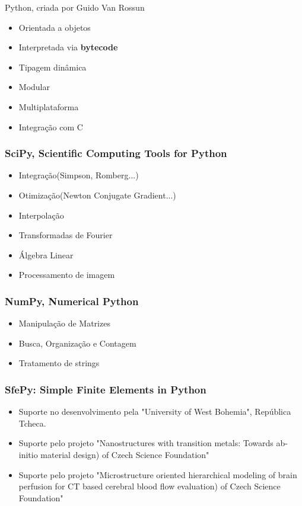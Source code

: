 \documentclass{beamer}
\begin{document}
\begin{frame}
    Python, criada por Guido Van Rossun
    \begin{itemize}
        \item Orientada a objetos
        \item Interpretada via \textbf{bytecode}
        \item Tipagem dinâmica
        \item Modular
        \item Multiplataforma
        \item Integração com C
    \end{itemize}
\end{frame}

\begin{frame}
    \frametitle{SciPy, Scientific Computing Tools for Python}
    \begin{itemize}
        \item Integração(Simpson, Romberg...)
        \item Otimização(Newton Conjugate Gradient...)
        \item Interpolação
        \item Transformadas de Fourier
        \item Álgebra Linear
        \item Processamento de imagem
    \end{itemize}
\end{frame}


\begin{frame}
    \frametitle{NumPy, Numerical Python}
    \begin{itemize}
        \item Manipulação de Matrizes
        \item Busca, Organização e Contagem
        \item Tratamento de strings
    \end{itemize}
\end{frame}

\begin{frame}
    \frametitle{SfePy: Simple Finite Elements in Python}

    \begin{itemize}
        \item Suporte no desenvolvimento pela "University of West Bohemia", República Tcheca.
        \item Suporte pelo projeto "Nanostructures with transition metals: Towards ab-initio material design) of Czech Science Foundation"
        \item Suporte pelo projeto "Microstructure oriented hierarchical modeling of brain perfusion for CT based cerebral blood flow evaluation) of Czech Science Foundation"
    \end{itemize}
\end{frame}
\end{document}
